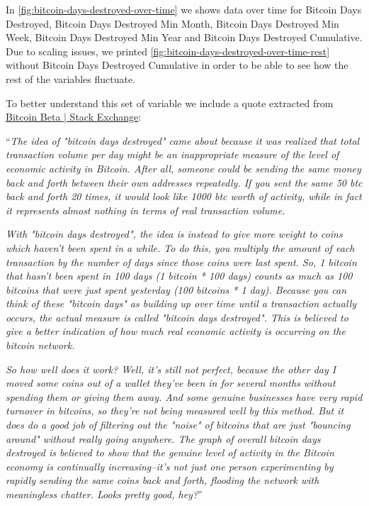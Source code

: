 In \autoref{fig:bitcoin-days-destroyed-over-time} we shows data over
time for Bitcoin Days Destroyed, Bitcoin Days Destroyed Min Month,
Bitcoin Days Destroyed Min Week, Bitcoin Days Destroyed Min Year and
Bitcoin Days Destroyed Cumulative. Due to scaling issues, we printed
\autoref{fig:bitcoin-days-destroyed-over-time-rest} without Bitcoin
Days Destroyed Cumulative in order to be able to see how the rest of
the variables fluctuate.

To better understand this set of variable we include a quote extracted
from
\href{http://bitcoin.stackexchange.com/questions/845/what-are-bitcoin-days-destroyed}{Bitcoin
  Beta | Stack Exchange}:

``\textit{The idea of "bitcoin days destroyed" came about because it
  was realized that total transaction volume per day might be an
  inappropriate measure of the level of economic activity in Bitcoin.
  After all, someone could be sending the same money back and forth
  between their own addresses repeatedly. If you sent the same 50 btc
  back and forth 20 times, it would look like 1000 btc worth of
  activity, while in fact it represents almost nothing in terms of
  real transaction volume.}

\textit{With "bitcoin days destroyed", the idea is instead to give
  more weight to coins which haven't been spent in a while. To do
  this, you multiply the amount of each transaction by the number of
  days since those coins were last spent. So, 1 bitcoin that hasn't
  been spent in 100 days (1 bitcoin * 100 days) counts as much as 100
  bitcoins that were just spent yesterday (100 bitcoins * 1 day).
  Because you can think of these "bitcoin days" as building up over
  time until a transaction actually occurs, the actual measure is
  called "bitcoin days destroyed". This is believed to give a better
  indication of how much real economic activity is occurring on the
  bitcoin network.}

\textit{ So how well does it work? Well, it's still not perfect,
  because the other day I moved some coins out of a wallet they've
  been in for several months without spending them or giving them
  away. And some genuine businesses have very rapid turnover in
  bitcoins, so they're not being measured well by this method. But it
  does do a good job of filtering out the "noise" of bitcoins that are
  just "bouncing around" without really going anywhere. The graph of
  overall bitcoin days destroyed is believed to show that the genuine
  level of activity in the Bitcoin economy is continually
  increasing--it's not just one person experimenting by rapidly
  sending the same coins back and forth, flooding the network with
  meaningless chatter. Looks pretty good, hey?}''

